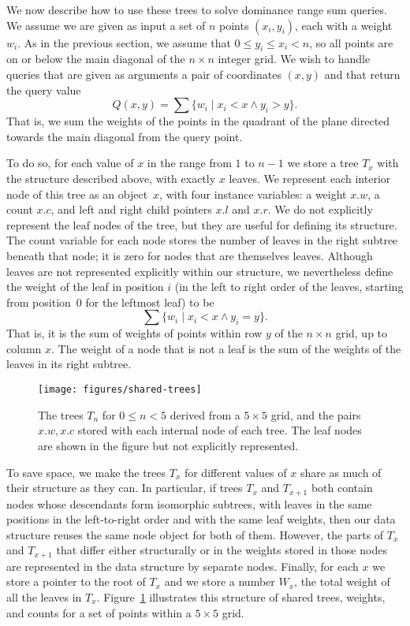 \documentclass[11pt]{article}
\begin{document}
We now describe how to use these trees to solve dominance range sum queries. We assume we are given as input a set of $n$ points $(x_i,y_i)$, each with a weight~$w_i$. As in the previous section, we assume that $0\le y_i\le x_i<n$, so all points are on or below the main diagonal of the $n\times n$ integer grid. We wish to handle queries that are given as arguments a pair of coordinates $(x,y)$ and that return the query value
$$Q(x,y)=\sum\{w_i\mid x_i< x\wedge y_i> y\}.$$
That is, we sum the weights of the points in the quadrant of the plane directed towards the main diagonal from the query point.

To do so, for each value of $x$ in the range from $1$ to $n-1$ we store a tree $T_x$ with the structure described above, with exactly $x$ leaves. We represent each interior node of this tree as an object~$x$, with four instance variables: a weight $x.w$, a count $x.c$, and left and right child pointers $x.l$ and $x.r$. We do not explicitly represent the leaf nodes of the tree, but they are useful for defining its structure. The count variable for each node stores the number of leaves in the right subtree beneath that node; it is zero for nodes that are themselves leaves. Although leaves are not represented explicitly within our structure, we nevertheless define the weight of the leaf in position $i$ (in the left to right order of the leaves, starting from position~0 for the leftmost leaf) to be
$$\sum\{w_i\mid x_i<x\wedge y_i=y\}.$$
That is, it is the sum of weights of points within row $y$ of the $n\times n$ grid, up to column $x$.
The weight of a node that is not a leaf is the sum of the weights of the leaves in its right subtree.

\begin{figure}[t]
\centering\texttt{[image: figures/shared-trees]}
\caption{The trees $T_n$ for $0\le n<5$ derived from a $5\times 5$ grid, and the pairs $x.w,x.c$ stored with each internal node of each tree. The leaf nodes are shown in the figure but not explicitly represented.}
\label{fig:shared-trees}
\end{figure}

To save space, we make the trees $T_x$ for different values of $x$ share as much of their structure as they can. In particular, if trees $T_x$ and $T_{x+1}$ both contain nodes whose descendants form isomorphic subtrees, with leaves in the same positions in the left-to-right order and with the same leaf weights, then our data structure reuses the same node object for both of them. However, the parts of $T_x$ and $T_{x+1}$ that differ either structurally or in the weights stored in those nodes are represented in the data structure by separate nodes. Finally, for each $x$ we store a pointer to the root of $T_x$ and we store a number $W_x$, the total weight of all the leaves in $T_x$. Figure~\ref{fig:shared-trees} illustrates this structure of shared trees, weights, and counts for a set of points within a $5\times 5$ grid.
\end{document}
